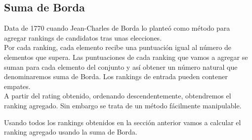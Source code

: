 \subsection{Suma de Borda}
Data de 1770 cuando Jean-Charles de Borda lo planteó como método para agregar rankings de candidatos tras unas elecciones.\\

Por cada ranking, cada elemento recibe una puntuación igual al número de elementos que supera. Las puntuaciones de cada ranking que vamos a agregar se suman para cada elemento del conjunto y así obtener un número natural que denominaremos suma de Borda. Los rankings de entrada pueden contener empates.\\
A partir del rating obtenido, ordenando descendentemente, obtendremos el ranking agregado. Sin embargo se trata de un método fácilmente manipulable.


\begin{ejem} Usando todos los rankings obtenidos en la sección anterior vamos a calcular el ranking agregado usando la suma de Borda.
\end{ejem}


